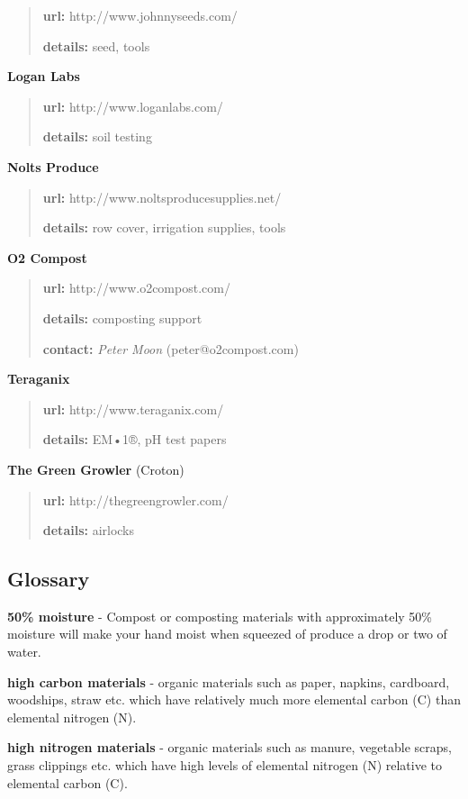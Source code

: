 \begin{quote}
\textbf{url:} http://www.johnnyseeds.com/

\textbf{details:} seed, tools
\end{quote}

\textbf{Logan Labs}

\begin{quote}
\textbf{url:} http://www.loganlabs.com/

\textbf{details:} soil testing
\end{quote}

\textbf{Nolts Produce}

\begin{quote}
\textbf{url:} http://www.noltsproducesupplies.net/

\textbf{details:} row cover, irrigation supplies, tools
\end{quote}

\textbf{O2 Compost}

\begin{quote}
\textbf{url:} http://www.o2compost.com/

\textbf{details:} composting support

\textbf{contact:} \emph{Peter Moon} (peter@o2compost.com)
\end{quote}

\textbf{Teraganix}

\begin{quote}
\textbf{url:} http://www.teraganix.com/

\textbf{details:} EM•1®, pH test papers
\end{quote}

\textbf{The Green Growler} (Croton)

\begin{quote}
\textbf{url:} http://thegreengrowler.com/

\textbf{details:} airlocks
\end{quote}

\subsection{Glossary}\label{glossary}

\textbf{50\% moisture} - Compost or composting materials with
approximately 50\% moisture will make your hand moist when squeezed of
produce a drop or two of water.

\textbf{high carbon materials} - organic materials such as paper,
napkins, cardboard, woodships, straw etc. which have relatively much
more elemental carbon (C) than elemental nitrogen (N).

\textbf{high nitrogen materials} - organic materials such as manure,
vegetable scraps, grass clippings etc. which have high levels of
elemental nitrogen (N) relative to elemental carbon (C).
